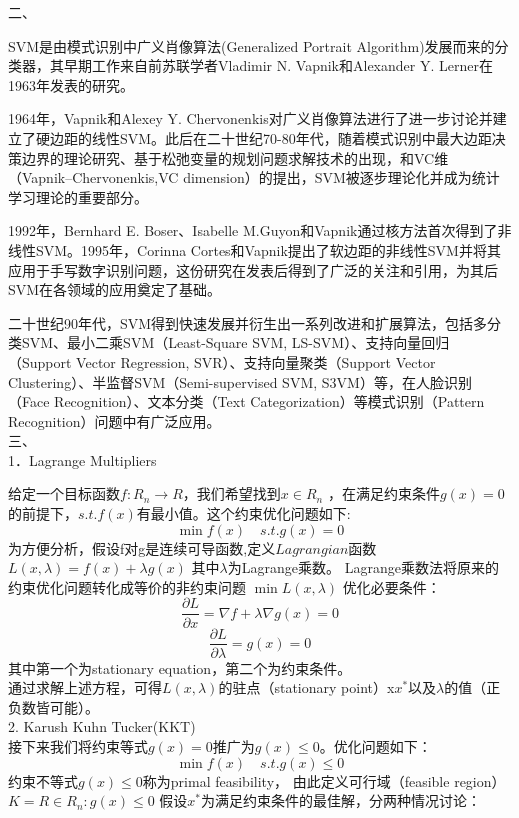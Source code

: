 \documentclass[UTF8]{article}
\begin{document}
{二、	{}

SVM是由模式识别中广义肖像算法(Generalized Portrait Algorithm)发展而来的分类器，其早期工作来自前苏联学者Vladimir N. Vapnik和Alexander Y. Lerner在1963年发表的研究。

1964年，Vapnik和Alexey Y. Chervonenkis对广义肖像算法进行了进一步讨论并建立了硬边距的线性SVM。此后在二十世纪70-80年代，随着模式识别中最大边距决策边界的理论研究、基于松弛变量的规划问题求解技术的出现，和VC维（Vapnik–Chervonenkis,VC dimension）的提出，SVM被逐步理论化并成为统计学习理论的重要部分。

1992年，Bernhard E. Boser、Isabelle M.Guyon和Vapnik通过核方法首次得到了非线性SVM。1995年，Corinna Cortes和Vapnik提出了软边距的非线性SVM并将其应用于手写数字识别问题，这份研究在发表后得到了广泛的关注和引用，为其后SVM在各领域的应用奠定了基础。

二十世纪90年代，SVM得到快速发展并衍生出一系列改进和扩展算法，包括多分类SVM、最小二乘SVM（Least-Square SVM, LS-SVM）、支持向量回归（Support Vector Regression, SVR）、支持向量聚类（Support Vector Clustering）、半监督SVM（Semi-supervised SVM, S3VM）等，在人脸识别（Face Recognition）、文本分类（Text Categorization）等模式识别（Pattern Recognition）问题中有广泛应用。\\

三、{}\\
1．Lagrange Multipliers

给定一个目标函数$f:R_n\to R$，我们希望找到$x \in {R_n}$ ，在满足约束条件$g(x)=0$的前提下，$s.t.f(x)$有最小值。这个约束优化问题如下:\\
$$\min f(x)\quad s.t. g(x)=0$$
为方便分析，假设f对g是连续可导函数,定义$Lagrangian$函数$L(x,\lambda)=f(x)+λg(x)$
其中$\lambda$为Lagrange乘数。
Lagrange乘数法将原来的约束优化问题转化成等价的非约束问题
$\min L(x,\lambda)$
优化必要条件：
$$\frac{\partial L}{\partial x}= \nabla f+ \lambda \nabla g(x)=0$$
$$\frac{\partial L}{\partial \lambda}= g(x)=0$$
其中第一个为stationary equation，第二个为约束条件。\\通过求解上述方程，可得$L(x,\lambda)$的驻点（stationary point）x$x^{*}$以及$\lambda$的值（正负数皆可能）。\\
2. Karush Kuhn Tucker(KKT)\\
接下来我们将约束等式$g(x)=0$推广为$g(x)\le 0$。优化问题如下：
$$\min f(x)\quad
s.t. g(x) \le 0$$
约束不等式$g(x)\le 0$称为primal feasibility， 由此定义可行域（feasible region）
$K={R\in R_n:g(x)\le 0}$
假设$x^*$为满足约束条件的最佳解，分两种情况讨论：

}
\end{document}
